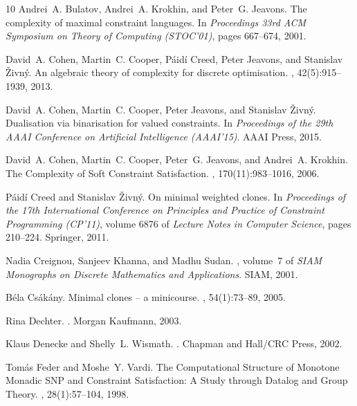 \documentclass[11pt, reqno]{article}
\theoremstyle{remark}
\begin{document}
\begin{thebibliography}{10}
Andrei~A. Bulatov, Andrei~A. Krokhin, and Peter~G. Jeavons.
\newblock The complexity of maximal constraint languages.
\newblock In {\em Proceedings 33rd {A}{C}{M} {S}ymposium on {T}heory of
  {C}omputing ({S{T}{O}{C}'01})}, pages 667--674, 2001.

David~A. Cohen, Martin~C. Cooper, P\'aid\'i Creed, Peter Jeavons, and Stanislav
  {\v{Z}}ivn\'y.
\newblock An algebraic theory of complexity for discrete optimisation.
, 42(5):915--1939, 2013.

David~A. Cohen, Martin~C. Cooper, Peter Jeavons, and Stanislav
  {\v{Z}}ivn\'y.
\newblock Dualisation via binarisation for valued constraints.
\newblock In {\em Proceedings of the 29th AAAI Conference on Artificial
  Intelligence (AAAI'15)}. AAAI Press, 2015.

David~A. Cohen, Martin~C. Cooper, Peter~G. Jeavons, and Andrei~A. Krokhin.
\newblock The {C}omplexity of {S}oft {C}onstraint {S}atisfaction.
, 170(11):983--1016, 2006.

P\'aid\'i Creed and Stanislav {\v{Z}}ivn\'y.
\newblock On minimal weighted clones.
\newblock In {\em {P}roceedings of the 17th {I}nternational {C}onference on
  {P}rinciples and {P}ractice of {C}onstraint {P}rogramming ({C}{P}'11)},
  volume 6876 of {\em Lecture Notes in Computer Science}, pages 210--224.
  Springer, 2011.

Nadia Creignou, Sanjeev Khanna, and Madhu Sudan.
, volume~7 of {\em SIAM Monographs on Discrete
  Mathematics and Applications}.
\newblock SIAM, 2001.

B\'ela Cs\'ak\'any.
\newblock Minimal clones -- a minicourse.
, 54(1):73--89, 2005.

Rina Dechter.
.
\newblock Morgan Kaufmann, 2003.

Klaus Denecke and Shelly~L. Wismath.
.
\newblock Chapman and Hall/CRC Press, 2002.

Tom\'as Feder and Moshe~Y. Vardi.
\newblock The {C}omputational {S}tructure of {M}onotone {M}onadic {S{N}{P}} and
  {C}onstraint {S}atisfaction: {A} {S}tudy through {D}atalog and {G}roup
  {T}heory.
, 28(1):57--104, 1998.


\end{thebibliography}
\end{document}
